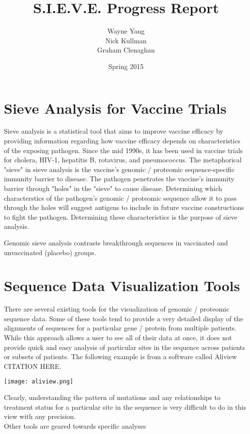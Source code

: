 \documentclass{article}
\begin{document}
\title{S.I.E.V.E. Progress Report}
\author{Wayne Yang \\ Nick Kullman \\ Graham Clenaghan}
\date{Spring 2015}
\maketitle

\section{Sieve Analysis for Vaccine Trials}

Sieve analysis is a statistical tool that aims to improve vaccine efficacy by providing information regarding how vaccine efficacy depends on characteristics of the exposing pathogen. 
Since the mid 1990s, it has been used in vaccine trials for cholera, HIV-1, hepatitis B, rotavirus, and pneumococcus. 
The metaphorical "sieve" in sieve analysis is the vaccine's genomic / proteomic sequence-specific immunity barrier to disease. The pathogen penetrates the vaccine's immunity barrier through "holes" in the "sieve" to cause disease.
Determining which characterstics of the pathogen's genomic / proteomic sequence allow it to pass through the holes will suggest antigens to include in future vaccine constructions to fight the pathogen.
Determining these characteristics is the purpose of sieve analysis. 

Genomic sieve analysis contrasts breakthrough sequences in vaccinated and unvaccinated (placebo) groups.

\section{Sequence Data Visualization Tools}

There are several existing tools for the visualization of genomic / proteomic sequence data.  Some of these tools tend to provide a very detailed display of the alignments of sequences for a particular gene / protein from multiple patients.  While this approach allows a user to see all of their data at once, it does not provide quick and easy analysis of particular sites in the sequence across patients or subsets of patients.  The following example is from a software called Aliview CITATION HERE.

\begin{center}
\texttt{[image: aliview.png]}
\end{center}
Clearly, understanding the pattern of mutations and any relationships to treatment status for a particular site in the sequence is very difficult to do in this view with any precision.
\\
\newline
\noindent Other tools are geared towards specific analyses
\end{document}
